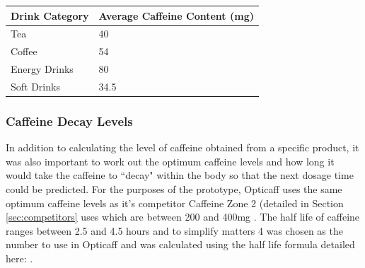 \begin{center}
\begin{tabular}{|l|l|}
\hline
\textbf{Drink Category} & \textbf{Average Caffeine Content (mg)} \\\hline
Tea & 40 \\\hline
Coffee & 54 \\\hline
Energy Drinks & 80 \\\hline
Soft Drinks & 34.5 \\\hline
\end{tabular}
\end{center}

\subsubsection{Caffeine Decay Levels}
In addition to calculating the level of caffeine obtained from a specific product, it was also important to work out the optimum caffeine levels and how long it would take the caffeine to ``decay" within the body so that the next dosage time could be predicted. For the purposes of the prototype, Opticaff uses the same optimum caffeine levels as it's competitor Caffeine Zone 2 (detailed in Section \ref{sec:competitors} uses which are between 200 and 400mg \cite{CaffeineZoneInfo}. The half life of caffeine ranges between 2.5 and 4.5 hours \cite{CaffeinePharmacology} \cite{CaffeinePharmacy} and to simplify matters 4 was chosen as the number to use in Opticaff and was calculated using the half life formula detailed here: \cite{HalfLife}.
 
